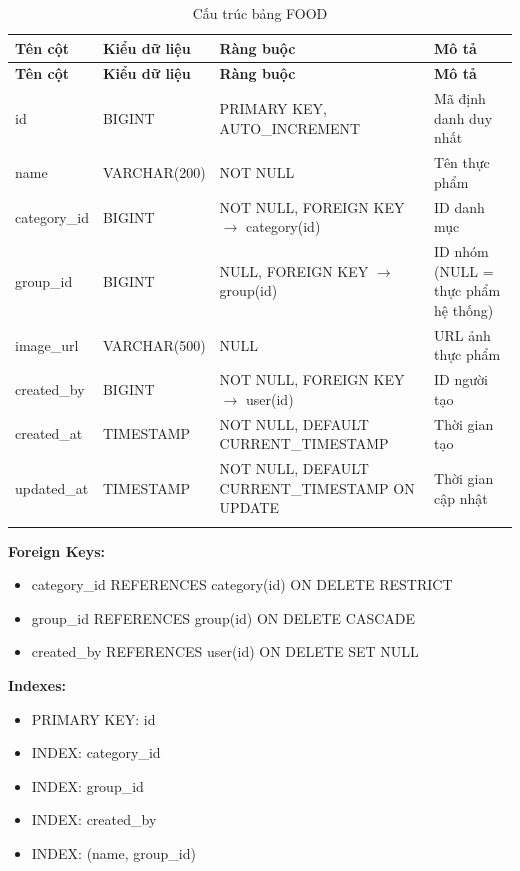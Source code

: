 \small
\begin{longtable}{|>{\raggedright\arraybackslash}p{3.5cm}|>{\raggedright\arraybackslash}p{3cm}|>{\raggedright\arraybackslash}p{4cm}|>{\raggedright\arraybackslash}p{4cm}|}
\hline
\textbf{Tên cột} & \textbf{Kiểu dữ liệu} & \textbf{Ràng buộc} & \textbf{Mô tả} \\
\hline
\endfirsthead
\hline
\textbf{Tên cột} & \textbf{Kiểu dữ liệu} & \textbf{Ràng buộc} & \textbf{Mô tả} \\
\hline
\endhead
id & BIGINT & PRIMARY KEY, AUTO\_INCREMENT & Mã định danh duy nhất \\
\hline
name & VARCHAR(200) & NOT NULL & Tên thực phẩm \\
\hline
category\_id & BIGINT & NOT NULL, FOREIGN KEY $\rightarrow$ category(id) & ID danh mục \\
\hline
group\_id & BIGINT & NULL, FOREIGN KEY $\rightarrow$ group(id) & ID nhóm (NULL = thực phẩm hệ thống) \\
\hline
image\_url & VARCHAR(500) & NULL & URL ảnh thực phẩm \\
\hline
created\_by & BIGINT & NOT NULL, FOREIGN KEY $\rightarrow$ user(id) & ID người tạo \\
\hline
created\_at & TIMESTAMP & NOT NULL, DEFAULT CURRENT\_TIMESTAMP & Thời gian tạo \\
\hline
updated\_at & TIMESTAMP & NOT NULL, DEFAULT CURRENT\_TIMESTAMP ON UPDATE & Thời gian cập nhật \\
\hline
\caption{Cấu trúc bảng FOOD}
\end{longtable}

\textbf{Foreign Keys:}
\begin{itemize}
    \item category\_id REFERENCES category(id) ON DELETE RESTRICT
    \item group\_id REFERENCES group(id) ON DELETE CASCADE
    \item created\_by REFERENCES user(id) ON DELETE SET NULL
\end{itemize}

\textbf{Indexes:}
\begin{itemize}
    \item PRIMARY KEY: id
    \item INDEX: category\_id
    \item INDEX: group\_id
    \item INDEX: created\_by
    \item INDEX: (name, group\_id)
\end{itemize}

